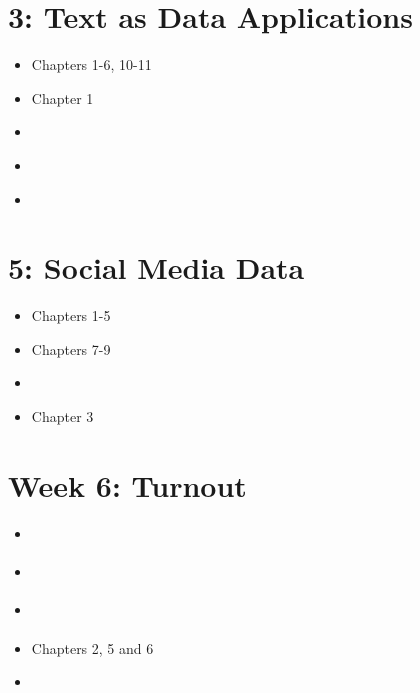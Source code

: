 \documentclass[]{article}
\begin{document}
 	\section*{\textnormal{3: Text as Data Applications}}
	
	
	
	\begin{itemize}
		\item \cite{zaller1992nature} Chapters 1-6, 10-11
		\item \cite{stimson2015tides} Chapter 1
		\item \cite{bullock2011elite} 
		
		\item \cite{shapiro2011public}
		\item \cite{cranmer2012heritability} 
		
		
	\end{itemize}

	\section*{\textnormal{5: Social Media Data}}

	
	
	
	\begin{itemize}
		\item \cite{bartels1988presidential} Chapters 1-5
		\item \cite{cohen2009party} Chapters 7-9
		
		\item \cite{holbrook1999political}
		\item \cite{geer2008defense} Chapter 3

		
	\end{itemize}


	\section*{\textnormal{Week 6: Turnout}}

	
	
	
	\begin{itemize}
		\item \cite{lijphart1997unequal} 
		\item \cite{aldrich1993rational} 
		 \item \cite{powell1986american} 
		\item \cite{leighley2013votes} Chapters 2, 5 and 6
		\item \cite{gentzkow2006television} 
		
		
	\end{itemize}



				{}
				
	
	
	
	
	
\end{document}
